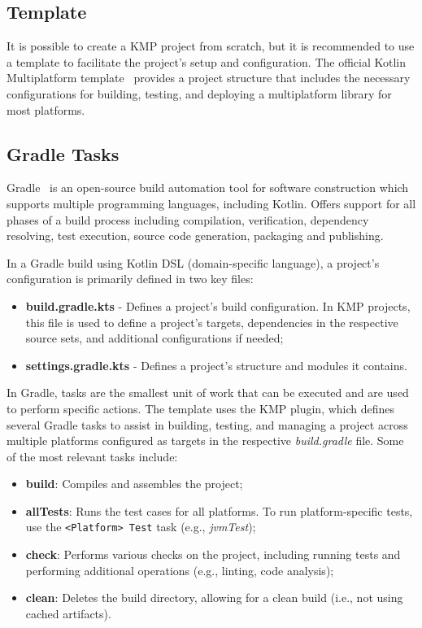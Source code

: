 \subsection{Template}\label{subsec:template}

It is possible to create a KMP project from scratch, but it is recommended to use a template to facilitate the project's setup and configuration.
The official Kotlin Multiplatform template~\cite{kmp-github-template} provides a project structure
that includes the necessary configurations for building,
testing,
and deploying a multiplatform library for most platforms.

\subsection{Gradle Tasks}\label{subsec:available-gradle-tasks}

Gradle~\cite{gradle} is an open-source build automation tool for software construction which supports multiple programming languages, including Kotlin.
Offers support for all phases of a build process including compilation, verification, dependency resolving, test execution, source code generation, packaging and publishing.

In a Gradle build using Kotlin DSL (domain-specific language), a project's configuration is primarily defined in two key files:

\begin{itemize}
    \item \textbf{build.gradle.kts} - Defines a project's build configuration.
    In KMP projects, this file is used to define a project's targets, dependencies in the respective source sets, and additional configurations if needed;
    \item \textbf{settings.gradle.kts} - Defines a project's structure and modules it contains.
\end{itemize}

In Gradle, tasks are the smallest unit of work that can be executed and are used to perform specific actions. The template uses the KMP plugin, which defines several Gradle tasks to assist in building, testing, and managing a project across multiple platforms configured as targets in the respective \textit{build.gradle} file.
Some of the most relevant tasks include:

\begin{itemize}
    \item \textbf{build}: Compiles and assembles the project;
    \item \textbf{allTests}: Runs the test cases for all platforms.
    To run platform-specific tests, use the \texttt{<Platform> Test} task (e.g., \textit{jvmTest});
    \item \textbf{check}: Performs various checks on the project, including running tests and performing additional operations (e.g., linting, code analysis);
    \item \textbf{clean}: Deletes the build directory, allowing for a clean build (i.e., not using cached artifacts).
\end{itemize}

